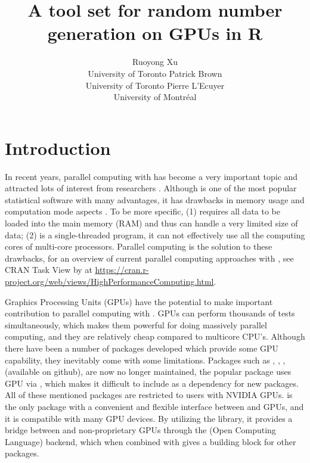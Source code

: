 \documentclass[article,nojss]{jss}\usepackage[]{graphicx}\usepackage[]{color}
\author{Ruoyong Xu\\University of Toronto
   \And Patrick Brown\\University of Toronto
   \And Pierre L’Ecuyer\\University of Montr\'eal}
\title{A tool set for random number generation on GPUs in R}
\begin{document}





\section[Introduction]{Introduction}

\begin{leftbar}
% 

In recent years, parallel computing with  \citep{r2021} has become a very important topic and attracted lots of interest from researchers \citep[see][for a review]{eddelbuettel2021parallel}. Although  is one of the most popular statistical software with many advantages, it has drawbacks in memory usage and computation mode aspects \citep{zhao_2016}. To be more specific, (1)  requires all data to be loaded into the main memory (RAM) and thus can handle a very limited size of data; (2)  is a single-threaded program, it can not effectively use all the computing cores of multi-core processors. Parallel computing is the solution to these drawbacks, for an overview of current parallel computing approaches with , see CRAN Task View by \citet{cran2021} at \url{https://cran.r-project.org/web/views/HighPerformanceComputing.html}. 

Graphics Processing Units (GPUs) have the potential to make important contribution to parallel computing with . GPUs can perform thousands of tests simultaneously, which makes them powerful for doing massively parallel computing, and they are relatively cheap compared to multicore CPU's. Although there have been a number of  packages developed which provide some GPU capability, they inevitably come with some limitations. Packages such as , , ,  (available on github), are now no longer maintained, the popular  \citep{tensorflow1} package uses GPU via , which makes it difficult to include as a dependency for new  packages. All of these mentioned packages are restricted to  users with NVIDIA GPUs.  \citep{gpur1} is the only  package with a convenient and flexible interface between  and GPUs, and it is compatible with many GPU devices. By utilizing the  \citep*{rupp2016viennacl} library, it provides a bridge between  and non-proprietary GPUs through the  (Open Computing Language) backend, which when combined with  \citep{rcpp1} gives a building block for other  packages. 


\end{leftbar}
\end{document}
